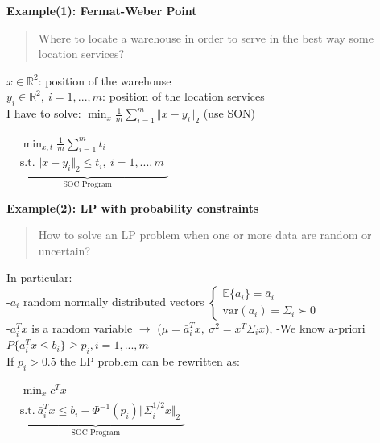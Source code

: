 \documentclass[a4paper]{article}
\begin{document}
\begin{multicols}{2}
    \noindent
    \textbf{Example(1): Fermat-Weber Point}
    \begin{quote}
        Where to locate a warehouse in order to serve in the best way some location services?
    \end{quote}
    $x\in\mathbb{R}^2$: position of the warehouse\\
    $y_i\in\mathbb{R}^2, \ i=1,...,m$: position of the location services\\
    I have to solve: $\min_{x}\frac{1}{m} \sum_{i=1}^m {\Vert{x-y_i}\Vert_2}$ (use SON)
    \begin{center}
        $\underbrace{\begin{aligned}
            &\min_{x,t} \frac{1}{m} \sum_{i=1}^m{t_i}\\
            &\text{s.t.} \ \Vert x-y_i \Vert_2 \le t_i, \ i=1,..., m
        \end{aligned}}_{\text{SOC Program}}$
    \end{center}    
    \newcolumn 
    \textbf{Example(2): LP with probability constraints}
    \begin{quote}
        How to solve an LP problem when one or more data are random or uncertain?
    \end{quote}
    In particular: \\
    -$a_i$ random normally distributed vectors $\begin{cases}
        \mathbb{E}\{a_i\}=\bar{a}_i\\
        \text{var}(a_i)=\Sigma_i\succ0
    \end{cases}$\\
    -$a_i^T{x}$ is a random variable $\to$ ($\mu=\bar{a}_i^T{x}, \ \sigma^2=x^T\Sigma_i{x})$, 
    -We know a-priori $P\{a_i^T{x}\le{b_i}\}\ge{p_i}, i=1,...,m$\\
    If $p_i>0.5$ the LP problem can be rewritten as: 
    \begin{center}
        $\underbrace{\begin{aligned}
            &\min_{x} {c^T{x}}\\
            &\text{s.t.} \ \bar{a}_i^{T}{x}\le b_i - \Phi^{-1}(p_i)\Vert \Sigma_i^{1/2}{x}\Vert_2
        \end{aligned}}_{\text{SOC Program}}$
    \end{center}
\end{multicols}
\vspace{-0.8cm}
\end{document}
